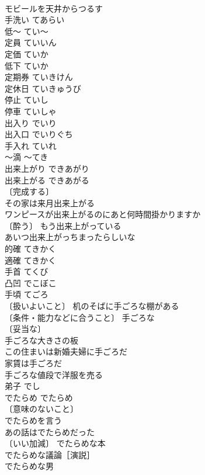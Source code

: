 \documentclass[8pt]{extreport}
\begin{document}
\begin{CJK}{UTF8}{min}
\\	モビールを天井からつるす 
\\	手洗い	てあらい	
\\	低～	てい～	
\\	定員	ていいん	
\\	定価	ていか	
\\	低下	ていか	
\\	定期券	ていきけん	
\\	定休日	ていきゅうび	
\\	停止	ていし	
\\	停車	ていしゃ	
\\	出入り	でいり	
\\	出入口	でいりぐち	
\\	手入れ	ていれ	
\\	～滴	～てき	
\\	出来上がり	できあがり	
\\	出来上がる	できあがる	
\\	〔完成する〕
\\	その家は来月出来上がる 
\\	ワンピースが出来上がるのにあと何時間掛かりますか 
\\	〔酔う〕 もう出来上がっている 
\\	あいつ出来上がっちまったらしいな 
\\	的確	てきかく	
\\	適確	てきかく	
\\	手首	てくび	
\\	凸凹	でこぼこ	
\\	手頃	てごろ	
\\	〔扱いよいこと〕 机のそばに手ごろな棚がある 
\\	〔条件・能力などに合うこと〕 手ごろな 
\\	〔妥当な〕
\\	手ごろな大きさの板 
\\	この住まいは新婚夫婦に手ごろだ 
\\	家賃は手ごろだ 
\\	手ごろな値段で洋服を売る 
\\	弟子	でし	
\\	でたらめ	でたらめ	
\\	〔意味のないこと〕
\\	でたらめを言う 
\\	あの話はでたらめだった 
\\	〔いい加減〕 でたらめな本 
\\	でたらめな議論［演説］ 
\\	でたらめな男 

\end{CJK}
\end{document}
